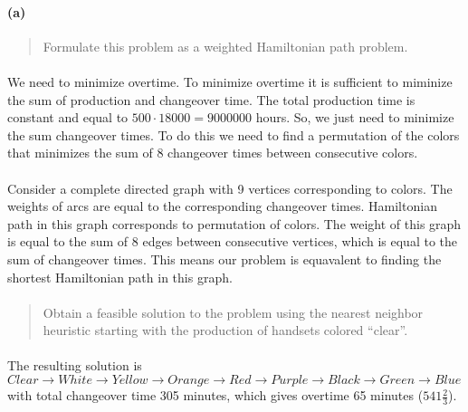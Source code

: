 \paragraph{(a)}
\begin{quote}
Formulate this problem as a weighted Hamiltonian path problem.
\end{quote}

\paragraph{}
We need to minimize overtime. To minimize overtime it is sufficient to miminize the sum of production and changeover time. The total production time is constant and equal to $500 \cdot 18000 = 9000000$ hours. So, we just need to minimize the sum changeover times. To do this we need to find a permutation of the colors that minimizes the sum of 8 changeover times between consecutive colors.

\paragraph{}
Consider a complete directed graph with 9 vertices corresponding to colors. The weights of arcs are equal to the corresponding changeover times. Hamiltonian path in this graph corresponds to permutation of colors. The weight of this graph is equal to the sum of 8 edges between consecutive vertices, which is equal to the sum of changeover times. This means our problem is equavalent to finding the shortest Hamiltonian path in this graph.

\paragraph{}
\begin{quote}
Obtain a feasible solution to the problem using the nearest neighbor heuristic
starting with the production of handsets colored ``clear''.
\end{quote}

\paragraph{}
The resulting solution is $ Clear \rightarrow White \rightarrow Yellow \rightarrow Orange \rightarrow Red \rightarrow Purple \rightarrow Black \rightarrow Green \rightarrow Blue $ with total changeover time 305 minutes, which gives overtime 65 minutes (\texteuro $541\frac{2}{3}$).

